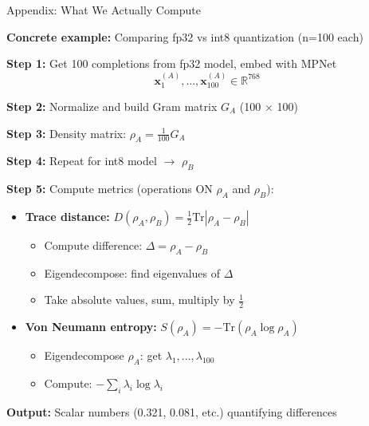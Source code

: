 \documentclass[aspectratio=169,11pt]{beamer}
\begin{document}
\begin{frame}{Appendix: What We Actually Compute}

\textbf{Concrete example:} Comparing fp32 vs int8 quantization (n=100 each)

\vspace{0.5em}

\textbf{Step 1:} Get 100 completions from fp32 model, embed with MPNet
$$\mathbf{x}_1^{(A)}, \ldots, \mathbf{x}_{100}^{(A)} \in \mathbb{R}^{768}$$

\textbf{Step 2:} Normalize and build Gram matrix $G_A$ (100 $\times$ 100)

\textbf{Step 3:} Density matrix: $\rho_A = \frac{1}{100} G_A$

\textbf{Step 4:} Repeat for int8 model $\to$ $\rho_B$

\vspace{0.5em}

\textbf{Step 5:} Compute metrics (operations ON $\rho_A$ and $\rho_B$):

\begin{itemize}
  \item \textbf{Trace distance:} $D(\rho_A, \rho_B) = \frac{1}{2}\text{Tr}|\rho_A - \rho_B|$
  \begin{itemize}
    \item Compute difference: $\Delta = \rho_A - \rho_B$
    \item Eigendecompose: find eigenvalues of $\Delta$
    \item Take absolute values, sum, multiply by $\frac{1}{2}$
  \end{itemize}

  \item \textbf{Von Neumann entropy:} $S(\rho_A) = -\text{Tr}(\rho_A \log \rho_A)$
  \begin{itemize}
    \item Eigendecompose $\rho_A$: get $\lambda_1, \ldots, \lambda_{100}$
    \item Compute: $-\sum_i \lambda_i \log \lambda_i$
  \end{itemize}
\end{itemize}

\vspace{0.3em}

\textbf{Output:} Scalar numbers (0.321, 0.081, etc.) quantifying differences

\end{frame}
\end{document}
